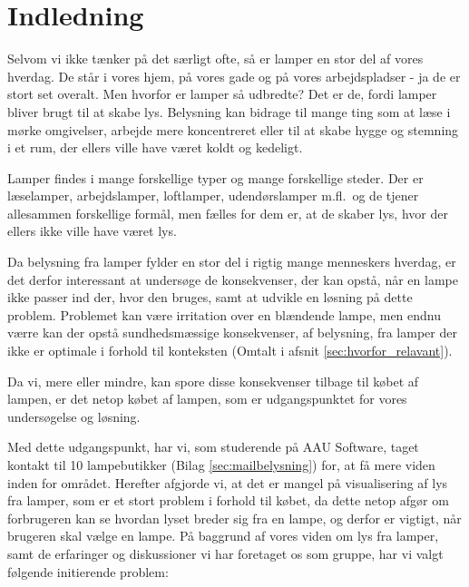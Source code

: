 \section{Indledning}
Selvom vi ikke tænker på det særligt ofte, så er lamper en stor del af vores hverdag. De står i vores hjem, på vores gade og på vores arbejdspladser - ja de er stort set overalt. Men hvorfor er lamper så udbredte? Det er de, fordi lamper bliver brugt til at skabe lys. Belysning kan bidrage til mange ting som at læse i mørke omgivelser, arbejde mere koncentreret eller til at skabe hygge og stemning i et rum, der ellers ville have været koldt og kedeligt. 

Lamper findes i mange forskellige typer og mange forskellige steder. Der er læselamper, arbejdslamper, loftlamper, udendørslamper m.fl.\ og de tjener allesammen forskellige formål, men fælles for dem er, at de skaber lys, hvor der ellers ikke ville have været lys. 

Da belysning fra lamper fylder en stor del i rigtig mange menneskers hverdag, er det derfor interessant at undersøge de konsekvenser, der kan opstå, når en lampe ikke passer ind der, hvor den bruges, samt at udvikle en løsning på dette problem. Problemet kan være irritation over en blændende lampe, men endnu værre kan der opstå sundhedsmæssige konsekvenser, af belysning, fra lamper der ikke er optimale i forhold til konteksten (Omtalt i afsnit \ref{sec:hvorfor_relavant}).

Da vi, mere eller mindre, kan spore disse konsekvenser tilbage til købet af lampen, er det netop købet af lampen, som er udgangspunktet for vores undersøgelse og løsning.

Med dette udgangspunkt, har vi, som studerende på AAU Software, taget kontakt til 10 lampebutikker (Bilag \ref{sec:mailbelysning}) for, at få mere viden inden for området. Herefter afgjorde vi, at det er mangel på visualisering af lys fra lamper, som er et stort problem i forhold til købet, da dette netop afgør om forbrugeren kan se hvordan lyset breder sig fra en lampe, og derfor er vigtigt, når brugeren skal vælge en lampe. På baggrund af vores viden om lys fra lamper, samt de erfaringer og diskussioner vi har foretaget os som gruppe, har vi valgt følgende initierende problem:


\clearpage
